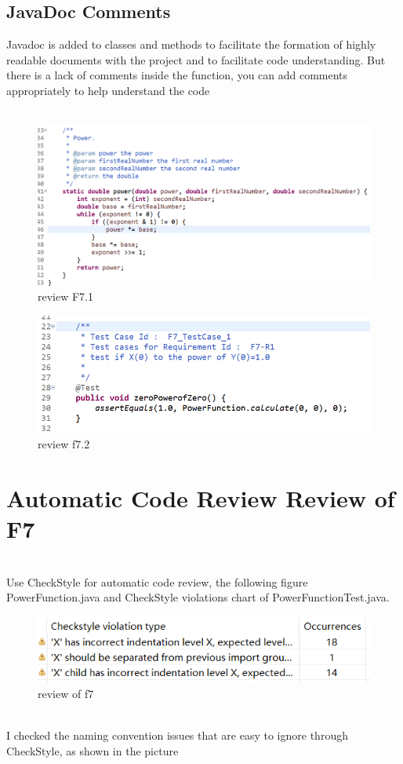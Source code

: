 \documentclass[letterpaper, 11pt]{report}
\begin{document}
\subsection*{JavaDoc Comments}
Javadoc is added to classes and methods to facilitate the formation of highly readable documents with the project and to facilitate code understanding. But there is a lack of comments inside the function, you can add comments appropriately to help understand the code\\\\
\begin{figure}[htp]
    \centering
    \includegraphics[width=16cm]{F5p51}
    \caption{review F7.1}
    \label{fig:galaxy}
\end{figure}
\begin{figure}[htp]
    \centering
    \includegraphics[width=16cm]{F5p52}
    \caption{review f7.2}
    \label{fig:galaxy}
\end{figure}
\section*{Automatic Code Review Review of F7}
\\Use CheckStyle for automatic code review, the following figure PowerFunction.java and CheckStyle violations chart of PowerFunctionTest.java.
\begin{figure}[htp]
    \centering
    \includegraphics[width=16cm]{SOEN_6011-Problem-5/f5111.png}
    \caption{review of f7}
\end{figure}
\\I checked the naming convention issues that are easy to ignore through CheckStyle, as shown in the  picture
\end{document}
